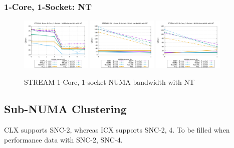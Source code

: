 \documentclass{article}
\begin{document}
\subsubsection{1-Core, 1-Socket: NT}
\begin{figure}[!ht]
    \centering
    \includegraphics[width=0.3\textwidth]{../mem_bw_numa/Rome_numa_nps4_compact_nt}
    \includegraphics[width=0.3\textwidth]{../mem_bw_numa/ICX_numa_nps1_compact_nt}
    \includegraphics[width=0.3\textwidth]{../mem_bw_numa/CLX_numa_nps1_compact_nt}
    \caption{STREAM 1-Core, 1-socket NUMA bandwidth with NT}
    \label{figure:mem_bw_numa_nt}
\end{figure}



\subsection{Sub-NUMA Clustering}
CLX supports SNC-2, whereas ICX supports SNC-2, 4. To be filled when performance data with SNC-2, SNC-4.
\end{document}
